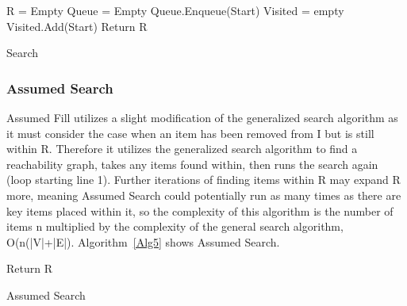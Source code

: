 \documentclass{ieeeaccess}
\begin{document}
\begin{algorithm}
\label{Alg4}
\SetAlgoLined
{}
    R = Empty\;
    Queue = Empty\;
    Queue.Enqueue(Start)\;
    Visited = empty\;
    Visited.Add(Start)\;
    Return R\;
 \caption{Search}
\end{algorithm}

\subsubsection{Assumed Search}

Assumed Fill utilizes a slight modification of the generalized search algorithm as it must
consider the case when an item has been removed from I but is still within R. Therefore it
utilizes the generalized search algorithm to find a reachability graph, takes any items found
within, then runs the search again (loop starting line 1). Further iterations of finding items 
within R may expand R more, meaning Assumed Search could potentially run as many times as there 
are key items placed within it, so the complexity of this algorithm is the number of items n 
multiplied by the complexity of the general search algorithm, O(n(|V|+|E|). 
Algorithm~\ref{Alg5} shows Assumed Search.

\begin{algorithm}
\label{Alg5}
\SetAlgoLined
{}
    Return R\;
 \caption{Assumed Search}
\end{algorithm}
\end{document}
